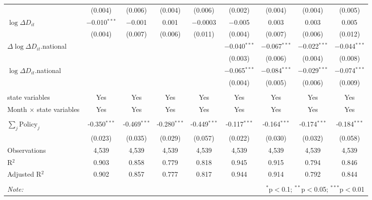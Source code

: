 \begin{tabular}{@{\extracolsep{1pt}}lcccccccc}
  & (0.004) & (0.006) & (0.004) & (0.006) & (0.002) & (0.004) & (0.004) & (0.005) \\ 
  $\log \Delta D_{it}$ & $-$0.010$^{***}$ & $-$0.001 & 0.001 & $-$0.0003 & $-$0.005 & 0.003 & 0.003 & 0.005 \\ 
  & (0.004) & (0.007) & (0.006) & (0.011) & (0.004) & (0.007) & (0.006) & (0.012) \\ 
  $\Delta \log \Delta D_{it}$.national &  &  &  &  & $-$0.040$^{***}$ & $-$0.067$^{***}$ & $-$0.022$^{***}$ & $-$0.044$^{***}$ \\ 
  &  &  &  &  & (0.003) & (0.006) & (0.004) & (0.008) \\ 
  $\log \Delta D_{it}$.national &  &  &  &  & $-$0.065$^{***}$ & $-$0.084$^{***}$ & $-$0.029$^{***}$ & $-$0.074$^{***}$ \\ 
  &  &  &  &  & (0.004) & (0.005) & (0.006) & (0.009) \\ 
 \hline \\[-1.8ex] 
state variables & Yes & Yes & Yes & Yes & Yes & Yes & Yes & Yes \\ 
Month $\times$ state variables & Yes & Yes & Yes & Yes & Yes & Yes & Yes & Yes \\ 
\hline \\[-1.8ex] 
$\sum_j \mathrm{Policy}_j$ & -0.350$^{***}$ & -0.469$^{***}$ & -0.280$^{***}$ & -0.449$^{***}$ & -0.117$^{***}$ & -0.164$^{***}$ & -0.174$^{***}$ & -0.184$^{***}$ \\ 
 & (0.023) & (0.035) & (0.029) & (0.057) & (0.022) & (0.030) & (0.032) & (0.058) \\ 
Observations & 4,539 & 4,539 & 4,539 & 4,539 & 4,539 & 4,539 & 4,539 & 4,539 \\ 
R$^{2}$ & 0.903 & 0.858 & 0.779 & 0.818 & 0.945 & 0.915 & 0.794 & 0.846 \\ 
Adjusted R$^{2}$ & 0.902 & 0.857 & 0.777 & 0.817 & 0.944 & 0.914 & 0.792 & 0.844 \\ 
\hline 
\hline \\[-1.8ex] 
\textit{Note:}  & \multicolumn{8}{r}{$^{*}$p$<$0.1; $^{**}$p$<$0.05; $^{***}$p$<$0.01} \\ 
\end{tabular} 